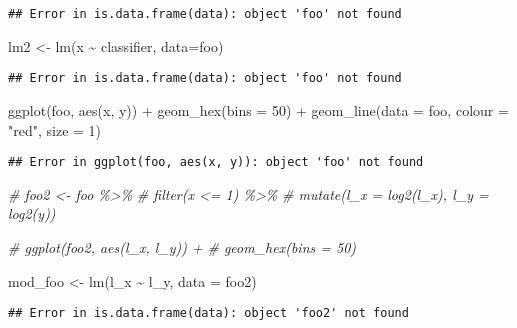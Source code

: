 \documentclass[
]{article}
\newenvironment{Shaded}{\begin{snugshade}}{\end{snugshade}}
\newcommand{\AttributeTok}[1]{\textcolor[rgb]{0.77,0.63,0.00}{#1}}
\newcommand{\CommentTok}[1]{\textcolor[rgb]{0.56,0.35,0.01}{\textit{#1}}}
\newcommand{\DecValTok}[1]{\textcolor[rgb]{0.00,0.00,0.81}{#1}}
\newcommand{\FunctionTok}[1]{\textcolor[rgb]{0.00,0.00,0.00}{#1}}
\newcommand{\NormalTok}[1]{#1}
\newcommand{\OtherTok}[1]{\textcolor[rgb]{0.56,0.35,0.01}{#1}}
\newcommand{\SpecialCharTok}[1]{\textcolor[rgb]{0.00,0.00,0.00}{#1}}
\newcommand{\StringTok}[1]{\textcolor[rgb]{0.31,0.60,0.02}{#1}}
\begin{document}
\begin{verbatim}
## Error in is.data.frame(data): object 'foo' not found
\end{verbatim}

\begin{Shaded}
\begin{Highlighting}[]
\NormalTok{lm2 }\OtherTok{\textless{}{-}} \FunctionTok{lm}\NormalTok{(x }\SpecialCharTok{\textasciitilde{}}\NormalTok{ classifier, }\AttributeTok{data=}\NormalTok{foo)}
\end{Highlighting}
\end{Shaded}

\begin{verbatim}
## Error in is.data.frame(data): object 'foo' not found
\end{verbatim}

\begin{Shaded}
\begin{Highlighting}[]
\FunctionTok{ggplot}\NormalTok{(foo, }\FunctionTok{aes}\NormalTok{(x, y)) }\SpecialCharTok{+} 
  \FunctionTok{geom\_hex}\NormalTok{(}\AttributeTok{bins =} \DecValTok{50}\NormalTok{) }\SpecialCharTok{+} 
  \FunctionTok{geom\_line}\NormalTok{(}\AttributeTok{data =}\NormalTok{ foo, }\AttributeTok{colour =} \StringTok{"red"}\NormalTok{, }\AttributeTok{size =} \DecValTok{1}\NormalTok{)}
\end{Highlighting}
\end{Shaded}

\begin{verbatim}
## Error in ggplot(foo, aes(x, y)): object 'foo' not found
\end{verbatim}

\begin{Shaded}
\begin{Highlighting}[]
\CommentTok{\# foo2 \textless{}{-} foo \%\textgreater{}\%}
\CommentTok{\#   filter(x \textless{}= 1) \%\textgreater{}\%}
\CommentTok{\#   mutate(l\_x = log2(l\_x), l\_y = log2(y))}

\CommentTok{\# ggplot(foo2, aes(l\_x, l\_y)) + }
\CommentTok{\#  geom\_hex(bins = 50)}

\NormalTok{mod\_foo }\OtherTok{\textless{}{-}} \FunctionTok{lm}\NormalTok{(l\_x }\SpecialCharTok{\textasciitilde{}}\NormalTok{ l\_y, }\AttributeTok{data =}\NormalTok{ foo2)}
\end{Highlighting}
\end{Shaded}

\begin{verbatim}
## Error in is.data.frame(data): object 'foo2' not found
\end{verbatim}
\end{document}

